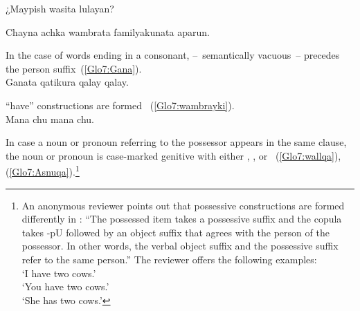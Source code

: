 %
{¿Maypish wasita lulayan?}%
{}%
{}{}%

%
{Chayna achka wambrata familyakunata aparun.}%
{}%
{}{}%

\noindent
In the case of words ending in a consonant,  --~semantically vacuous~-- precedes the person suffix~(\ref{Glo7:Gana}).\\

%
{Ganata qatikura qalay qalay.}%
{}%
{}{}%

\noindent
\SYQ{} “have” constructions are formed  ~(\ref{Glo7:wambrayki}).\\

%
{Mana chu mana chu.}%
{}%
{}{}%

\noindent
In case a noun or pronoun referring to the possessor appears in the same clause, the noun or pronoun is case-marked genitive with either , , or ~(\ref{Glo7:wallqa}), (\ref{Glo7:Asnuqa}).\footnote{An anonymous reviewer points out that possessive constructions are formed differently in \QI{}: “The possessed item takes a possessive suffix and the copula takes -pU followed by an object suffix that agrees with the person of the possessor. In other words, the verbal object suffix and the possessive suffix refer to the same person.” The reviewer offers the following examples:\\
 ‘I have two cows.’\\
 ‘You have two cows.’\\
 ‘She has two cows.’}\\

